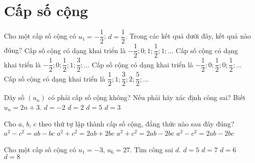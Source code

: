 \section{Cấp số cộng}
\begin{ex}%
Cho một cấp số cộng có $u_1 = -\dfrac{1}{2}$; $d= \dfrac{1}{2}$. Trong các kết quả dưới đây, kết quả nào đúng?
\choice
{Cấp số cộng có dạng khai triển là $-\dfrac{1}{2}; 0; 1; \dfrac{1}{2}; 1; \ldots $}
{\True Cấp số cộng có dạng khai triển là $-\dfrac{1}{2}; 0; \dfrac{1}{2}; 1; \dfrac{3}{2}; \ldots $}
{Cấp số cộng có dạng khai triển là $-\dfrac{1}{2}; 0; \dfrac{1}{2}; 0; \dfrac{1}{2}; \ldots $}
{Cấp số cộng có dạng khai triển là $\dfrac{1}{2}; 1; \dfrac{3}{2}; 2; \dfrac{5}{2}; \ldots $}
\end{ex} 
\begin{ex}%
	Dãy số $(u_n)$ có phải cấp số cộng không? Nếu phải hãy xác định công sai? Biết $u_n=2n+3$.
	\choice
	{$d=-2$}
	{\True $d=2$}
	{$d=5$}
	{$d=3$}
\end{ex}
\begin{ex}%
	Cho $a$, $b$, $c$ theo thứ tự lập thành cấp số cộng, đẳng thức nào sau đây đúng?
	\choice
	{$a^2-c^2=ab-bc$}
	{$a^2+c^2=2ab+2bc$}
	{$a^2+c^2=2ab-2bc$}
	{\True $a^2-c^2=2ab-2bc$}
\end{ex}
\begin{ex}%
Cho một cấp số cộng có $u_1=-3$, $u_6=27$. Tìm công sai $d$.
\choice
{$d=5$}
{$d=7$}
{\True $d=6$}
{$d=8$}
\end{ex}
